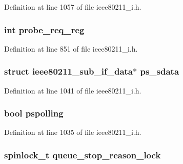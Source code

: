 Definition at line 1057 of file ieee80211\-\_\-i.\-h.

\hypertarget{structieee80211__local_ab293743371aeef9182e1e8c5be0d26f6}{
\subsubsection[{probe\-\_\-req\-\_\-reg}]{\setlength{\rightskip}{0pt plus 5cm}int probe\-\_\-req\-\_\-reg}}\label{structieee80211__local_ab293743371aeef9182e1e8c5be0d26f6}


Definition at line 851 of file ieee80211\-\_\-i.\-h.

\hypertarget{structieee80211__local_af1cdea8e67f896a2208f1e05403a5bda}{
\subsubsection[{ps\-\_\-sdata}]{\setlength{\rightskip}{0pt plus 5cm}struct {\bf ieee80211\-\_\-sub\-\_\-if\-\_\-data}$\ast$ ps\-\_\-sdata}}\label{structieee80211__local_af1cdea8e67f896a2208f1e05403a5bda}


Definition at line 1041 of file ieee80211\-\_\-i.\-h.

\hypertarget{structieee80211__local_ab5292154aefaae54f246320fd4afbf11}{
\subsubsection[{pspolling}]{\setlength{\rightskip}{0pt plus 5cm}bool pspolling}}\label{structieee80211__local_ab5292154aefaae54f246320fd4afbf11}


Definition at line 1035 of file ieee80211\-\_\-i.\-h.

\hypertarget{structieee80211__local_a6a4677a1a1ad602030742ceba058133b}{
\subsubsection[{queue\-\_\-stop\-\_\-reason\-\_\-lock}]{\setlength{\rightskip}{0pt plus 5cm}spinlock\-\_\-t queue\-\_\-stop\-\_\-reason\-\_\-lock}}\label{structieee80211__local_a6a4677a1a1ad602030742ceba058133b}


